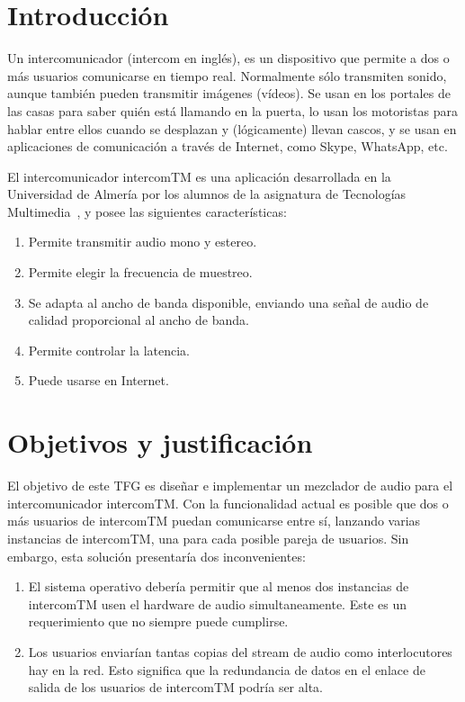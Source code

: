 \documentclass[titlepage, 12pt, a4paper, oneside]{article}
\begin{document}
\normalsize

\section{Introducción}
\label{sec:intro}
Un intercomunicador (intercom en inglés), es un dispositivo que
permite a dos o más usuarios comunicarse en tiempo real. Normalmente
sólo transmiten sonido, aunque también pueden transmitir imágenes
(vídeos). Se usan en los portales de las casas para saber quién está
llamando en la puerta, lo usan los motoristas para hablar entre ellos
cuando se desplazan y (lógicamente) llevan cascos, y se usan en
aplicaciones de comunicación a través de Internet, como Skype,
WhatsApp, etc.

El intercomunicador intercomTM es una aplicación desarrollada en la
Universidad de Almería por los alumnos de la asignatura de Tecnologías
Multimedia~\cite{intercomTM}, y posee las siguientes características:
\begin{enumerate}
\item Permite transmitir audio mono y estereo.
\item Permite elegir la frecuencia de muestreo.
\item Se adapta al ancho de banda disponible, enviando una señal de
  audio de calidad proporcional al ancho de banda.
\item Permite controlar la latencia.
\item Puede usarse en Internet.
\end{enumerate}

\section{Objetivos y justificación}
\label{sec:objetivos}
El objetivo de este TFG es diseñar e implementar un mezclador de audio
para el intercomunicador intercomTM. Con la funcionalidad actual es
posible que dos o más usuarios de intercomTM puedan comunicarse entre
sí, lanzando varias instancias de intercomTM, una para cada posible
pareja de usuarios. Sin embargo, esta solución presentaría dos
inconvenientes:
\begin{enumerate}
\item El sistema operativo debería permitir que al menos dos instancias
  de intercomTM usen el hardware de audio simultaneamente. Este es un
  requerimiento que no siempre puede cumplirse.
\item Los usuarios enviarían tantas copias del stream de audio como
  interlocutores hay en la red. Esto significa que la redundancia de
  datos en el enlace de salida de los usuarios de intercomTM podría
  ser alta.
\end{enumerate}
\end{document}
